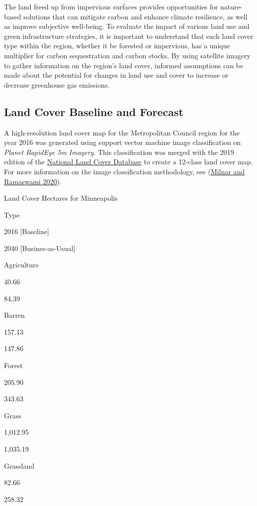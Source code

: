 \documentclass[
]{book}
\begin{document}
The land freed up from impervious surfaces provides opportunities for nature-based solutions that can mitigate carbon and enhance climate resilience, as well as improve subjective well-being. To evaluate the impact of various land use and green infrastructure strategies, it is important to understand that each land cover type within the region, whether it be forested or impervious, has a unique multiplier for carbon sequestration and carbon stocks. By using satellite imagery to gather information on the region's land cover, informed assumptions can be made about the potential for changes in land use and cover to increase or decrease greenhouse gas emissions.

\hypertarget{land-cover-baseline-and-forecast}{%
\subsection{Land Cover Baseline and Forecast}\label{land-cover-baseline-and-forecast}}

A high-resolution land cover map for the Metropolitan Council region for the year 2016 was generated using support vector machine image classification on \emph{Planet RapidEye 5m Imagery}. This classification was merged with the 2019 edition of the \href{https://www.usgs.gov/centers/eros/science/national-land-cover-database}{National Land Cover Database} to create a 12-class land cover map. For more information on the image classification methodology, see (\protect\hyperlink{ref-Milnar_Ramaswami_2020}{Milnar and Ramaswami 2020}).

\label{tab:tab-land-cover-by-land-use}Land Cover Hectares for Minneapolis

Type

2016 {[}Baseline{]}

2040 {[}Busines-as-Usual{]}

Agriculture

40.66

84.39

Barren

157.13

147.86

Forest

205.90

343.63

Grass

1,012.95

1,035.19

Grassland

82.66

258.32
\end{document}
